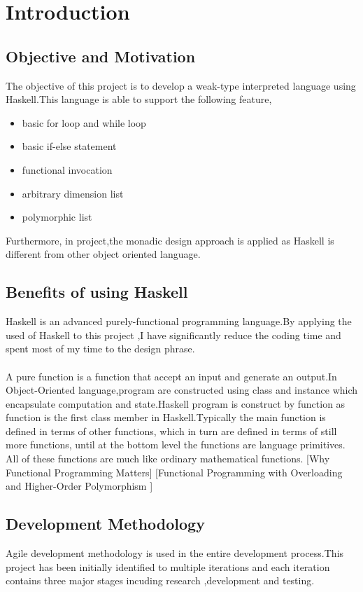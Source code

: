 \chapter{Introduction}
\section{Objective and Motivation}
The objective of this project is to develop a weak-type interpreted language using Haskell.This language is able to support the following feature,
\begin{itemize}
\item basic for loop and while loop
\item basic if-else statement
\item functional invocation 
\item arbitrary dimension list
\item polymorphic list
\end{itemize}

Furthermore, in project,the monadic design approach is applied as Haskell is different from other object oriented language.

\section{Benefits of using Haskell} 
Haskell is an advanced purely-functional programming language.By applying the used of Haskell to this project ,I have significantly reduce the coding time and spent most of my time to the design phrase.
\\
\\
A pure function is a function that accept an input and generate  an output.In Object-Oriented language,program are constructed using class and instance which encapsulate computation and state.Haskell program is construct by function as function is the first class member in Haskell.Typically the main function is defined in terms of
other functions, which in turn are defined in terms of still more functions, until at the bottom level the functions are language primitives. All of these functions are much like ordinary mathematical functions.
[Why Functional Programming Matters]
[Functional Programming with Overloading and
Higher-Order Polymorphism
]
\section{Development Methodology}
Agile development methodology is used in the entire development process.This project has been initially identified to multiple iterations and each iteration contains three major stages incuding research ,development and testing.
